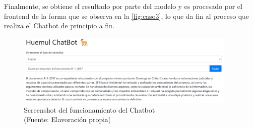 Finalmente, se obtiene el resultado por parte del modelo y es procesado por el frontend de la forma que se observa en la \autoref{fig:caso3}, 
lo que da fin al proceso que realiza el Chatbot de principio a fin.


\begin{figure}[ht!]
    \centering
    \includegraphics[width=0.95\textwidth]{figures/website2.png}
    \caption[Screenshot del funcionamiento del Chatbot]{Screenshot del funcionamiento del Chatbot\\
    {\scriptsize (Fuente: Elavoración propia)}}
    \label{fig:caso3}
\end{figure}